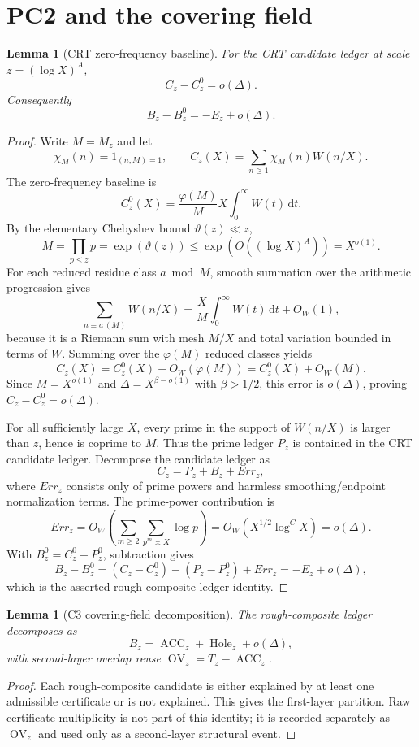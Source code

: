 \documentclass[11pt]{article}
\newtheorem{lemma}[theorem]{Lemma}
\theoremstyle{definition}
\newcommand{\dd}{\mathrm d}
\newcommand{\ACC}{\operatorname{ACC}}
\newcommand{\Hole}{\operatorname{Hole}}
\newcommand{\OV}{\operatorname{OV}}
\begin{document}
\section{PC2 and the covering field}\label{sec:pc2-c3}
\begin{lemma}[CRT zero-frequency baseline]\label{lem:pc2}
For the CRT candidate ledger at scale $z=(\log X)^A$,
\[
  C_z-C_z^0=o(\Delta).
\]
Consequently
\[
  B_z-B_z^0=-E_z+o(\Delta).
\]
\end{lemma}
\begin{proof}
Write $M=M_z$ and let
\[
  \chi_M(n)=1_{(n,M)=1},\qquad
  C_z(X)=\sum_{n\ge1}\chi_M(n)W(n/X).
\]
The zero-frequency baseline is
\[
  C_z^0(X)=\frac{\varphi(M)}{M}X\int_0^\infty W(t)\,\dd t .
\]
By the elementary Chebyshev bound $\vartheta(z)\ll z$,
\[
  M=\prod_{p\le z}p=\exp(\vartheta(z))\le \exp(O((\log X)^A))=X^{o(1)} .
\]
For each reduced residue class $a\bmod M$, smooth summation over the arithmetic progression gives
\[
  \sum_{n\equiv a\, (M)} W(n/X)
   =\frac{X}{M}\int_0^\infty W(t)\,\dd t+O_W(1),
\]
because it is a Riemann sum with mesh $M/X$ and total variation bounded in terms of $W$.  Summing over the $\varphi(M)$ reduced classes yields
\[
  C_z(X)=C_z^0(X)+O_W(\varphi(M))=C_z^0(X)+O_W(M).
\]
Since $M=X^{o(1)}$ and $\Delta=X^{\beta-o(1)}$ with $\beta>1/2$, this error is $o(\Delta)$, proving $C_z-C_z^0=o(\Delta)$.

For all sufficiently large $X$, every prime in the support of $W(n/X)$ is larger than $z$, hence is coprime to $M$.  Thus the prime ledger $P_z$ is contained in the CRT candidate ledger.  Decompose the candidate ledger as
\[
  C_z=P_z+B_z+Err_z,
\]
where $Err_z$ consists only of prime powers and harmless smoothing/endpoint normalization terms.  The prime-power contribution is
\[
  Err_z=O_W\!\left(\sum_{m\ge2}\sum_{p^m\asymp X}\log p\right)
       =O_W(X^{1/2}\log^C X)=o(\Delta).
\]
With $B_z^0=C_z^0-P_z^0$, subtraction gives
\[
  B_z-B_z^0=(C_z-C_z^0)-(P_z-P_z^0)+Err_z=-E_z+o(\Delta),
\]
which is the asserted rough-composite ledger identity.
\end{proof}

\begin{lemma}[C3 covering-field decomposition]\label{lem:c3}
The rough-composite ledger decomposes as
\[
  B_z=\ACC_z+\Hole_z+o(\Delta),
\]
with second-layer overlap reuse $\OV_z=T_z-\ACC_z$.
\end{lemma}
\begin{proof}
Each rough-composite candidate is either explained by at least one admissible certificate or is not explained.  This gives the first-layer partition.  Raw certificate multiplicity is not part of this identity; it is recorded separately as $\OV_z$ and used only as a second-layer structural event.
\end{proof}
\end{document}
